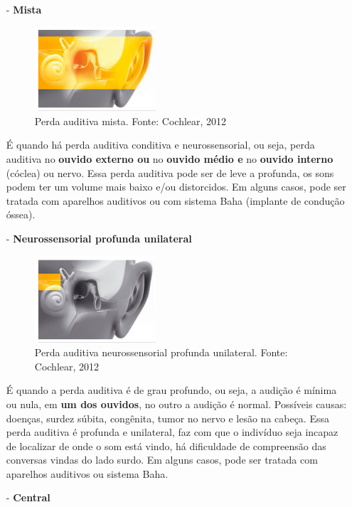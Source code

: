 \documentclass[brasil]{abnt}
\begin{document}
\begin{itemize}
					\item [-] \textbf{Mista} 
						\begin{figure}[!htb]
							\center
							\includegraphics[width=45mm]{pam.png}
							\caption{Perda auditiva mista. Fonte: Cochlear, 2012}
						\end{figure}
						
						É quando há perda auditiva conditiva e neurossensorial, ou seja, perda auditiva no \textbf{ouvido externo ou} no \textbf{ouvido médio e} no \textbf{ouvido interno} (cóclea) ou nervo. Essa perda auditiva pode ser de leve a profunda, 
						os sons podem ter um volume mais baixo e/ou distorcidos. Em alguns casos, pode ser tratada com aparelhos auditivos ou com sistema Baha (implante de condução óssea).
					
					\item [-] \textbf{Neurossensorial profunda unilateral} 
						\begin{figure}[!htb]
							\center
							\includegraphics[width=45mm]{panp.png}
							\caption{Perda auditiva neurossensorial profunda unilateral. Fonte: Cochlear, 2012}
						\end{figure}
						
						É quando a perda auditiva é de grau profundo, ou seja, a audição é mínima ou nula, em \textbf{um dos ouvidos}, no outro a audição é normal. Possíveis causas: doenças, surdez súbita, congênita, tumor no nervo e lesão na cabeça.
						Essa perda auditiva é profunda e unilateral, faz com que o indivíduo seja incapaz de localizar de onde o som está vindo, há dificuldade de compreensão das conversas vindas do lado surdo. Em alguns casos, pode ser
						tratada com aparelhos auditivos ou sistema Baha.
						
					\item [-] \textbf{Central} 
											

\end{itemize}
\end{document}
